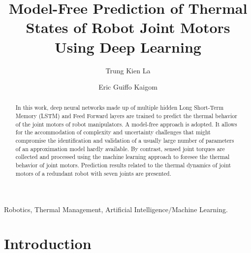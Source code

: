 \documentclass{ifacconf}
\begin{document}
\begin{frontmatter}

\title{Model-Free Prediction of  Thermal States of Robot Joint Motors Using Deep Learning} 


\author[First]{Trung Kien La} 
\author[First]{Eric Guiffo Kaigom} 

\address[First]{Department of Computer Science \& Engineering,
Frankfurt University of Applied Sciences, 60318 Frankfurt am Main, Germany (e-mails: trung.la@stud.fra-uas.de; kaigom@fb2.fra-uas.de).}

\begin{abstract}                %
In this work, deep neural networks made up of multiple hidden Long Short-Term Memory (LSTM) and Feed Forward layers are trained to predict the thermal behavior of the joint motors of robot manipulators. 
A model-free approach is adopted. It allows for the accommodation of complexity and uncertainty challenges that might compromise the identification and validation of a usually large number of  parameters of an approximation model hardly available. 
By contrast, sensed joint torques are collected and processed using the machine learning approach to foresee the thermal behavior of joint motors. Prediction results related to the thermal dynamics of joint motors of a redundant robot with seven joints are presented. 

\end{abstract}

\begin{keyword}
Robotics, Thermal Management, Artificial Intelligence$\slash$Machine Learning.
\end{keyword}

\end{frontmatter}

\section{Introduction}
\end{document}
